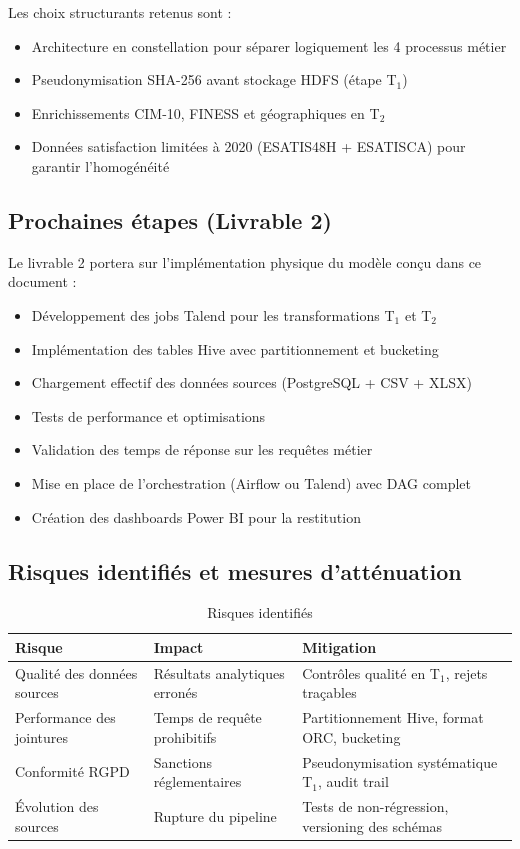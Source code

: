 \documentclass[12pt,a4paper]{article}
\begin{document}
Les choix structurants retenus sont :
\begin{itemize}[leftmargin=*]
    \item Architecture en constellation pour séparer logiquement les 4 processus métier
    \item Pseudonymisation SHA-256 avant stockage HDFS (étape T$_{1}$)
    \item Enrichissements CIM-10, FINESS et géographiques en T$_{2}$
    \item Données satisfaction limitées à 2020 (ESATIS48H + ESATISCA) pour garantir l'homogénéité
\end{itemize}

\subsection{Prochaines étapes (Livrable 2)}

Le livrable 2 portera sur l'implémentation physique du modèle conçu dans ce document :

\begin{itemize}[leftmargin=*]
    \item Développement des jobs Talend pour les transformations T$_{1}$ et T$_{2}$
    \item Implémentation des tables Hive avec partitionnement et bucketing
    \item Chargement effectif des données sources (PostgreSQL + CSV + XLSX)
    \item Tests de performance et optimisations
    \item Validation des temps de réponse sur les requêtes métier
    \item Mise en place de l'orchestration (Airflow ou Talend) avec DAG complet
    \item Création des dashboards Power BI pour la restitution
\end{itemize}

\subsection{Risques identifiés et mesures d'atténuation}

\begin{table}[H]
\centering
\caption{Risques identifiés}
\begin{tabularx}{\textwidth}{|l|X|X|}
\hline
\textbf{Risque} & \textbf{Impact} & \textbf{Mitigation} \\
\hline
Qualité des données sources & Résultats analytiques erronés & Contrôles qualité en T$_{1}$, rejets traçables \\
\hline
Performance des jointures & Temps de requête prohibitifs & Partitionnement Hive, format ORC, bucketing \\
\hline
Conformité RGPD & Sanctions réglementaires & Pseudonymisation systématique T$_{1}$, audit trail \\
\hline
Évolution des sources & Rupture du pipeline & Tests de non-régression, versioning des schémas \\
\hline
\end{tabularx}
\end{table}
\end{document}
